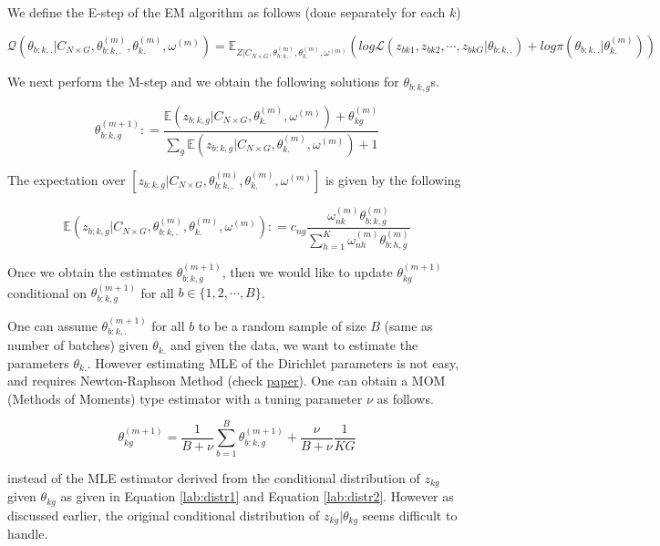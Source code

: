 \documentclass[]{article}
\begin{document}
We define the E-step of the EM algorithm as follows (done separately for
each \(k\))

\begin{equation}
\mathcal{Q} \left ( \theta_{b:k,.} | C_{N \times G}, \theta^{(m)}_{b:k,.}, \theta^{(m)}_{k.} , \omega^{(m)} \right ) = \mathbb{E}_{Z | C_{N \times G}, \theta^{(m)}_{b:k,.}, \theta^{(m)}_{k.} , \omega^{(m)}} \left ( log \mathcal{L} (z_{bk1}, z_{bk2}, \cdots, z_{bkG} | \theta_{b:k,.})  + log \pi(\theta_{b:k,.} | \theta^{(m)}_{k.} ) \right )
\label{lab:estep}
\end{equation}

We next perform the M-step and we obtain the following solutions for
\(\theta_{b:k,g}\)s.

\begin{equation}
\theta^{(m+1)}_{b:k,g} : = \frac{\mathbb{E} \left ( z_{b:k,g} |  C_{N \times G}, \theta^{(m)}_{k.} , \omega^{(m)} \right) + \theta^{(m)}_{kg}}{\sum_{g} \mathbb{E} \left ( z_{b:k,g} |  C_{N \times G}, \theta^{(m)}_{k.} , \omega^{(m)} \right) + 1}
\label{lab:mstep}
\end{equation}

The expectation over
\([ z_{b:k,g} | C_{N \times G}, \theta^{(m)}_{b:k,.}, \theta^{(m)}_{k.} , \omega^{(m)} ]\)
is given by the following

\[ \mathbb{E} \left ( z_{b:k,g} |  C_{N \times G}, \theta^{(m)}_{b:k,.}, \theta^{(m)}_{k.} , \omega^{(m)} \right) : = c_{ng} \frac{\omega^{(m)}_{nk} \theta^{(m)}_{b:k,g}}{\sum_{h=1}^{K} \omega^{(m)}_{nh} \theta^{(m)}_{b:h,g}} \]

Once we obtain the estimates \(\theta^{(m+1)}_{b:k,g}\), then we would
like to update \(\theta^{(m+1)}_{kg}\) conditional on
\(\theta^{(m+1)}_{b:k,g}\) for all \(b \in \{1,2, \cdots, B \}\).

One can assume \(\theta^{(m+1)}_{b:k,.}\) for all \(b\) to be a random
sample of size \(B\) (same as number of batches) given \(\theta_{k.}\)
and given the data, we want to estimate the parameters \(\theta_{k.}\).
However estimating MLE of the Dirichlet parameters is not easy, and
requires Newton-Raphson Method (check
\href{http://www.msr-waypoint.com/en-us/um/people/minka/papers/dirichlet/minka-dirichlet.pdf}{paper}).
One can obtain a MOM (Methods of Moments) type estimator with a tuning
parameter \(\nu\) as follows.

\[ \theta^{(m+1)}_{kg} = \frac{1}{B+\nu} \sum_{b=1}^{B} \theta^{(m+1)}_{b:k,g}  + \frac{\nu}{B+\nu} \frac{1}{KG} \]

instead of the MLE estimator derived from the conditional distribution
of \(z_{kg}\) given \(\theta_{kg}\) as given in Equation
\ref{lab:distr1} and Equation \ref{lab:distr2}. However as discussed
earlier, the original conditional distribution of
\(z_{kg} | \theta_{kg}\) seems difficult to handle.
\end{document}
